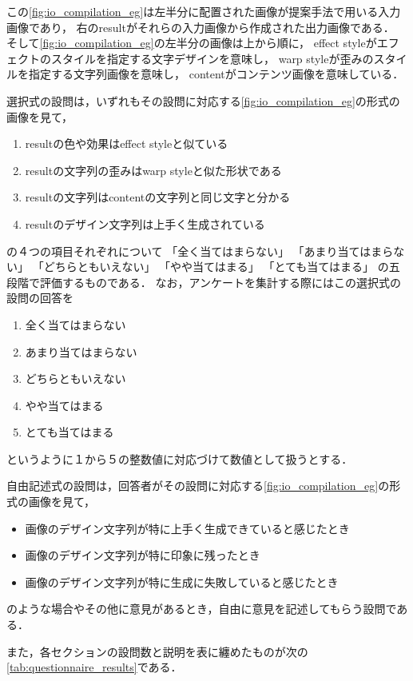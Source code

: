 \documentclass[\homedir/main.tex]{subfiles}
\begin{document}
この\cref{fig:io_compilation_eg}は左半分に配置された画像が提案手法で用いる入力画像であり，
右のresultがそれらの入力画像から作成された出力画像である．
そして\cref{fig:io_compilation_eg}の左半分の画像は上から順に，
effect styleがエフェクトのスタイルを指定する文字デザインを意味し，
warp styleが歪みのスタイルを指定する文字列画像を意味し，
contentがコンテンツ画像を意味している．

選択式の設問は，いずれもその設問に対応する\cref{fig:io_compilation_eg}の形式の画像を見て，
\begin{enumerate}[label=\textbf{項目\arabic*:}]
    \setlength{\leftskip}{0.8cm}
    \item resultの色や効果はeffect styleと似ている
    \item resultの文字列の歪みはwarp styleと似た形状である
    \item resultの文字列はcontentの文字列と同じ文字と分かる
    \item resultのデザイン文字列は上手く生成されている
\end{enumerate}
の４つの項目それぞれについて
「全く当てはまらない」
「あまり当てはまらない」
「どちらともいえない」
「やや当てはまる」
「とても当てはまる」
の五段階で評価するものである．
\newpage
なお，アンケートを集計する際にはこの選択式の設問の回答を
\begin{enumerate}
    \item 全く当てはまらない
    \item あまり当てはまらない
    \item どちらともいえない
    \item やや当てはまる
    \item とても当てはまる
\end{enumerate}
というように１から５の整数値に対応づけて数値として扱うとする．

自由記述式の設問は，回答者がその設問に対応する\cref{fig:io_compilation_eg}の形式の画像を見て，
\begin{itemize}
    \item 画像のデザイン文字列が特に上手く生成できていると感じたとき
    \item 画像のデザイン文字列が特に印象に残ったとき
    \item 画像のデザイン文字列が特に生成に失敗していると感じたとき
\end{itemize}
のような場合やその他に意見があるとき，自由に意見を記述してもらう設問である．

また，各セクションの設問数と説明を表に纏めたものが次の\cref{tab:questionnaire_results}である．
\end{document}
